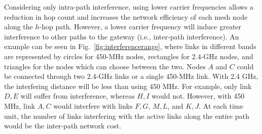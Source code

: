 Considering only intra-path interference, using lower carrier frequencies allows a
reduction in hop count and increases the network efficiency of each mesh node along
the $h$-hop path. However, a lower carrier frequency will induce greater interference
to other paths to the gateway (i.e., inter-path interference). An example can be seen 
in Fig.~\ref{fig:interferencerange}, where
links in different bands are represented by circles for 450-MHz nodes, rectangles for
2.4-GHz nodes, and triangles for the nodes which can choose between the two.
Nodes $A$ and $C$ could be connected through two 2.4-GHz links or a single 450-MHz link.
With 2.4 GHz, the interfering distance will be less than using 450 MHz. For example, only 
link $D,E$ will suffer from interference, whereas $H,I$ would not. However, with 450 MHz,
link $A,C$ would interfere with links $F,G$, $M,L$, and $K,J$. At each time unit, the number of
links interfering with the active links along the entire path would be the inter-path network cost.


